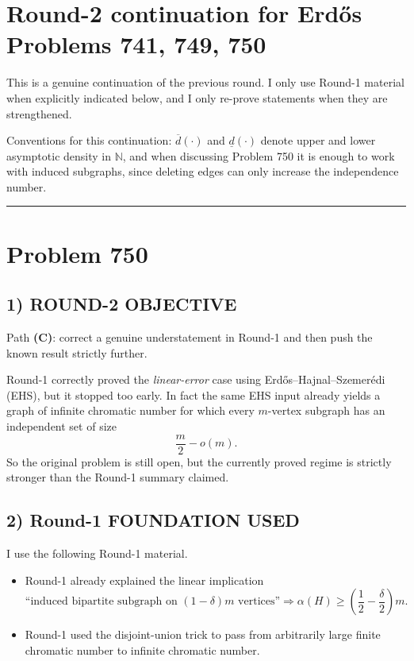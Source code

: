 \section*{Round-2 continuation for Erd\H{o}s Problems 741, 749, 750}

\noindent
This is a genuine continuation of the previous round. I only use Round-1 material when explicitly indicated below, and I only re-prove statements when they are strengthened.

\medskip
\noindent
Conventions for this continuation: $\overline d(\cdot)$ and $\underline d(\cdot)$ denote upper and lower asymptotic density in $\mathbb N$, and when discussing Problem 750 it is enough to work with induced subgraphs, since deleting edges can only increase the independence number.


\bigskip
\hrule
\bigskip

\section*{Problem 750}

\subsection*{1) ROUND-2 OBJECTIVE}

Path \textbf{(C)}: correct a genuine understatement in Round-1 and then push the known result strictly further.

Round-1 correctly proved the \emph{linear-error} case using Erd\H{o}s--Hajnal--Szemer\'edi (EHS), but it stopped too early. In fact the same EHS input already yields a graph of infinite chromatic number for which every $m$-vertex subgraph has an independent set of size
\[
\frac m2-o(m).
\]
So the original problem is still open, but the currently proved regime is strictly stronger than the Round-1 summary claimed.

\subsection*{2) Round-1 FOUNDATION USED}

I use the following Round-1 material.

\begin{itemize}
\item Round-1 already explained the linear implication
\[
\text{``induced bipartite subgraph on }(1-\delta)m\text{ vertices''}
\Longrightarrow
\alpha(H)\ge \left(\frac12-\frac\delta2\right)m.
\]
\item Round-1 used the disjoint-union trick to pass from arbitrarily large finite chromatic number to infinite chromatic number.
\end{itemize}

